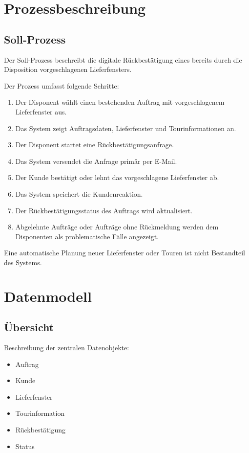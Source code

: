 \documentclass[12pt,a4paper]{article}
\begin{document}
\section{Prozessbeschreibung}
\subsection{Soll-Prozess}

Der Soll-Prozess beschreibt die digitale Rückbestätigung eines bereits durch die Disposition vorgeschlagenen Lieferfensters.

Der Prozess umfasst folgende Schritte:

\begin{enumerate}
    \item Der Disponent wählt einen bestehenden Auftrag mit vorgeschlagenem Lieferfenster aus.
    \item Das System zeigt Auftragsdaten, Lieferfenster und Tourinformationen an.
    \item Der Disponent startet eine Rückbestätigungsanfrage.
    \item Das System versendet die Anfrage primär per E-Mail.
    \item Der Kunde bestätigt oder lehnt das vorgeschlagene Lieferfenster ab.
    \item Das System speichert die Kundenreaktion.
    \item Der Rückbestätigungsstatus des Auftrags wird aktualisiert.
    \item Abgelehnte Aufträge oder Aufträge ohne Rückmeldung werden dem Disponenten als problematische Fälle angezeigt.
\end{enumerate}

Eine automatische Planung neuer Lieferfenster oder Touren ist nicht Bestandteil des Systems.

\section{Datenmodell}
\subsection{Übersicht}

Beschreibung der zentralen Datenobjekte:

\begin{itemize}
    \item Auftrag
    \item Kunde
    \item Lieferfenster
    \item Tourinformation
    \item Rückbestätigung
    \item Status
\end{itemize}
\end{document}
